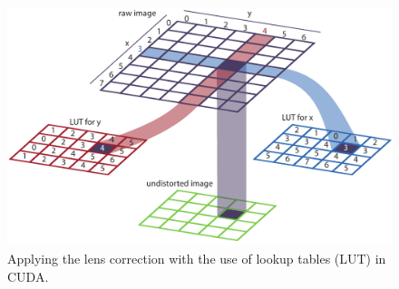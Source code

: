 \begin{figure}[H]
    \centering
    \includegraphics[width=1.0\textwidth]{images/undistort_LUT.pdf}
    \caption{Applying the lens correction with the use of lookup tables (LUT) in CUDA.}
    \label{im:CudaCamCalib}
\end{figure}

